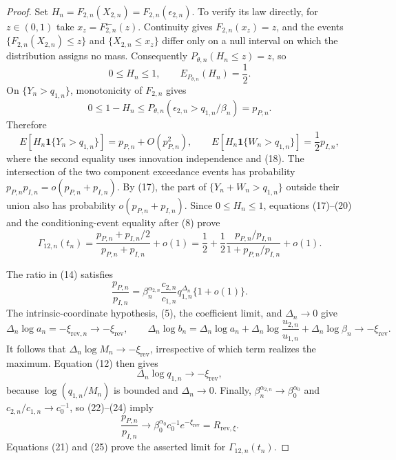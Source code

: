 \documentclass{article}
\begin{document}
\begin{proof}
Set \(H_n=F_{2,n}(X_{2,n})=F_{2,n}(\epsilon_{2,n})\). To verify its law
directly, for \(z\in(0,1)\) take
\(x_z=F_{2,n}^{\leftarrow}(z)\). Continuity gives \(F_{2,n}(x_z)=z\), and
the events \(\{F_{2,n}(X_{2,n})\leq z\}\) and \(\{X_{2,n}\leq x_z\}\)
differ only on a null interval on which the distribution assigns no mass.
Consequently \(P_{\theta,n}(H_n\leq z)=z\), so
\[
0\leq H_n\leq1,
\qquad
E_{P_{\theta,n}}(H_n)=\frac12.
\tag{18}
\]
On \(\{Y_n>q_{1,n}\}\), monotonicity of \(F_{2,n}\) gives
\[
0\leq1-H_n
\leq P_{\theta,n}(\epsilon_{2,n}>q_{1,n}/\beta_n)=p_{P,n}.
\tag{19}
\]
Therefore
\[
E[H_n\mathbf 1\{Y_n>q_{1,n}\}]
=p_{P,n}+O(p_{P,n}^2),
\qquad
E[H_n\mathbf 1\{W_n>q_{1,n}\}]
=\frac12p_{I,n},
\tag{20}
\]
where the second equality uses innovation independence and (18). The
intersection of the two component exceedance events has probability
\(p_{P,n}p_{I,n}=o(p_{P,n}+p_{I,n})\). By (17), the part of
\(\{Y_n+W_n>q_{1,n}\}\) outside their union also has probability
\(o(p_{P,n}+p_{I,n})\). Since \(0\leq H_n\leq1\), equations (17)--(20)
and the conditioning-event equality after (8) prove
\[
\Gamma_{12,n}(t_n)
=\frac{p_{P,n}+p_{I,n}/2}{p_{P,n}+p_{I,n}}+o(1)
=\frac12+\frac12\frac{p_{P,n}/p_{I,n}}{1+p_{P,n}/p_{I,n}}+o(1).
\tag{21}
\]

The ratio in (14) satisfies
\[
\frac{p_{P,n}}{p_{I,n}}
=\beta_n^{\alpha_{2,n}}\frac{c_{2,n}}{c_{1,n}}
q_{1,n}^{\Delta_n}\{1+o(1)\}.
\tag{22}
\]
The intrinsic-coordinate hypothesis, (5), the coefficient limit, and
\(\Delta_n\to0\) give
\[
\Delta_n\log a_n=-\xi_{\mathrm{rev},n}\to-\xi_{\mathrm{rev}},
\qquad
\Delta_n\log b_n
=\Delta_n\log a_n
+\Delta_n\log\frac{u_{2,n}}{u_{1,n}}
+\Delta_n\log\beta_n
\to-\xi_{\mathrm{rev}}.
\tag{23}
\]
It follows that \(\Delta_n\log M_n\to-\xi_{\mathrm{rev}}\), irrespective
of which term realizes the maximum. Equation (12) then gives
\[
\Delta_n\log q_{1,n}\longrightarrow-\xi_{\mathrm{rev}},
\tag{24}
\]
because \(\log(q_{1,n}/M_n)\) is bounded and \(\Delta_n\to0\). Finally,
\(\beta_n^{\alpha_{2,n}}\to\beta_0^{\alpha_0}\) and
\(c_{2,n}/c_{1,n}\to c_0^{-1}\), so (22)--(24) imply
\[
\frac{p_{P,n}}{p_{I,n}}
\longrightarrow
\beta_0^{\alpha_0}c_0^{-1}e^{-\xi_{\mathrm{rev}}}
=R_{\mathrm{rev},\xi}.
\tag{25}
\]
Equations (21) and (25) prove the asserted limit for
\(\Gamma_{12,n}(t_n)\).


\end{proof}
\end{document}
